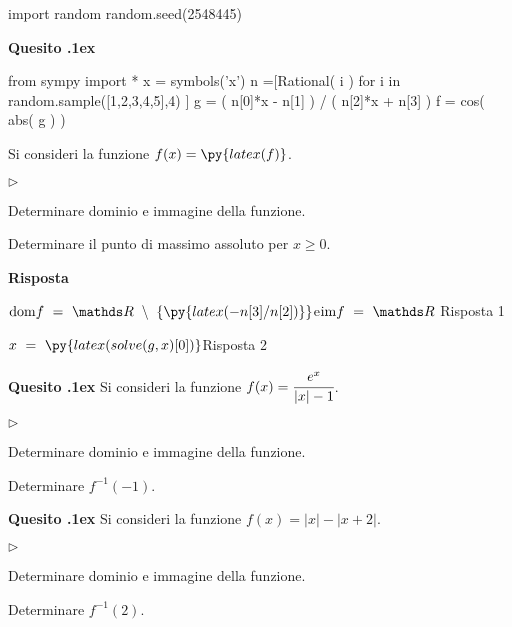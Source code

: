 \documentclass[11pt,twoside,a4paper]{article}
\newcommand{\mylabel}[1]{#1\hfill}
\renewenvironment{itemize}
  {\begin{list}{$\triangleright$}{%
   \setlength{\parskip}{0mm}
   \setlength{\topsep}{.4\baselineskip}
   \setlength{\rightmargin}{0mm}
   \setlength{\listparindent}{0mm}
   \setlength{\itemindent}{0mm}
   \setlength{\labelwidth}{2ex}
   \setlength{\itemsep}{.4\baselineskip}
   \setlength{\parsep}{0mm}
   \setlength{\partopsep}{0mm}
   \setlength{\labelsep}{1ex}
   \setlength{\leftmargin}{\labelwidth+\labelsep}
   \let\makelabel\mylabel}}{%
   \end{list}\vspace*{-1.3mm}}
\newcounter{quesito}
\newenvironment{question}{\bigskip\addtocounter{quesito}{1}\bigskip\bigskip\par\textbf{Quesito \thequesito.\kern1ex}}{\vspace{\parskip}}
\newenvironment{answer}{\par\textbf{Risposta\quad}}{\vspace{\parskip}}
\begin{document}
\begin{pycode}
import random
random.seed(2548445)
\end{pycode}

\begin{question}
\def\RR{{\mathds R}}
\def\dom{{\rm dom}}
\def\range{{\rm im}}
\begin{pycode}
from sympy import *
x = symbols('x')
n =[Rational( i ) for i in random.sample([1,2,3,4,5],4) ]
g = ( n[0]*x - n[1] ) / ( n[2]*x + n[3] )
f = cos( abs( g ) )
\end{pycode}
Si consideri la funzione $\displaystyle f(x) = \py{latex(f)}$.
\begin{itemize}
\item[1.] Determinare dominio e immagine della funzione.
\item[2.] Determinare il punto di massimo assoluto per $x \geq 0$.
\end{itemize}
\begin{answer}

\smallskip
{\color{blue}$\displaystyle \dom f \ =\ \RR\ \setminus\ \left\{\py{latex(-n[3]/n[2])}\right\} $\quad e\quad $\range f \ =\ \RR$ \hfill Risposta 1}

{\color{blue}$\displaystyle x\ =\ \py{latex(solve(g,x)[0])}$\hfill Risposta 2}

\end{answer}
\end{question}

\begin{question}
Si consideri la funzione $\displaystyle f(x) = \cfrac{e^x}{\lvert x \rvert - 1}$.
\begin{itemize}
\item[1.] Determinare dominio e immagine della funzione.
\item[2.] Determinare $f^{-1}(-1)$.
\end{itemize}
\end{question}

\begin{question}
Si consideri la funzione $\displaystyle f(x) = \lvert x \rvert - \lvert x + 2 \rvert$.
\begin{itemize}
\item[1.] Determinare dominio e immagine della funzione.
\item[2.] Determinare $f^{-1}(2)$.
\end{itemize}
\end{question}
\end{document}
